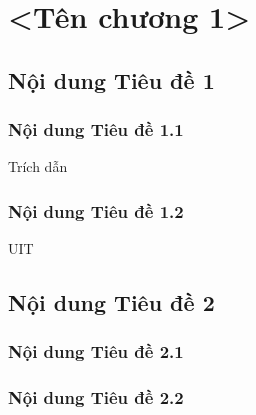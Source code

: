 \chapter{<Tên chương 1>}

\section{Nội dung Tiêu đề 1}
\subsection{Nội dung Tiêu đề 1.1}
Trích dẫn \cite{devlin-etal-2019-bert}
\subsection{Nội dung Tiêu đề 1.2}
\ac{UIT}

\section{Nội dung Tiêu đề 2}
\subsection{Nội dung Tiêu đề 2.1}
\subsection{Nội dung Tiêu đề 2.2}



